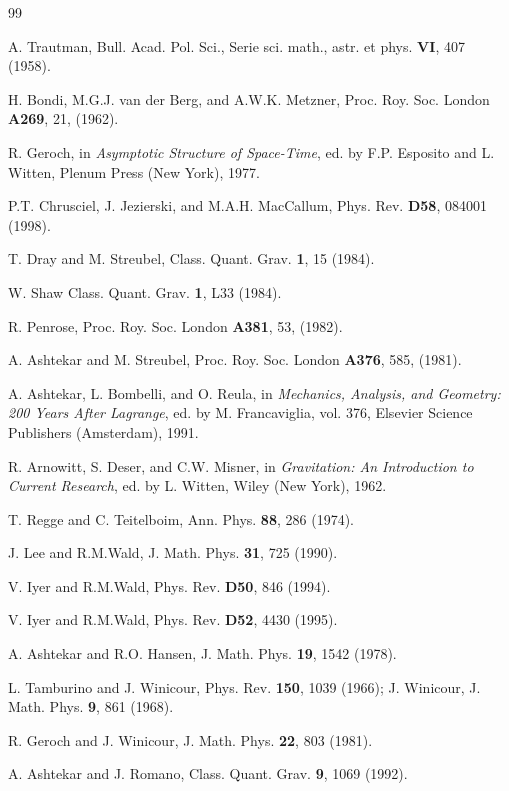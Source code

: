 \begin{thebibliography}{99}

 A. Trautman, Bull. Acad. Pol. Sci., Serie sci. math.,
astr. et phys. {\bf VI}, 407 (1958).

 H. Bondi, M.G.J. van der Berg, and A.W.K. Metzner,
Proc. Roy. Soc. London {\bf A269}, 21, (1962).

 R. Geroch, in {\it Asymptotic Structure of Space-Time},
ed. by F.P. Esposito and L. Witten, Plenum Press (New York), 1977.

 P.T. Chrusciel, J. Jezierski, and M.A.H. MacCallum,
Phys. Rev. {\bf D58}, 084001 (1998).

 T. Dray and M. Streubel, Class. Quant. Grav. {\bf 1}, 15
(1984).

 W. Shaw Class. Quant. Grav. {\bf 1}, L33 (1984).

 R. Penrose, Proc. Roy. Soc. London {\bf A381}, 53, (1982).

 A. Ashtekar and M. Streubel, Proc. Roy. Soc. London {\bf
A376}, 585, (1981).

 A. Ashtekar, L. Bombelli, and O. Reula, in {\it
Mechanics, Analysis, and Geometry: 200 Years After Lagrange}, ed. by
M. Francaviglia, vol. 376, Elsevier Science Publishers (Amsterdam),
1991.

 R. Arnowitt, S. Deser, and C.W. Misner, in {\it
Gravitation: An Introduction to Current Research}, ed. by L. Witten,
Wiley (New York), 1962.

 T. Regge and C. Teitelboim, Ann. Phys. {\bf 88}, 286
(1974).

 J. Lee and R.M.Wald, J. Math. Phys. {\bf 31}, 725 (1990).

 V. Iyer and R.M.Wald, Phys. Rev. {\bf D50}, 846 (1994).

 V. Iyer and R.M.Wald, Phys. Rev. {\bf D52}, 4430 (1995).

 A. Ashtekar and R.O. Hansen, J. Math. Phys. {\bf 19},
1542 (1978).

 L. Tamburino and J. Winicour, Phys. Rev. {\bf 150}, 1039
(1966); J. Winicour, J. Math. Phys. {\bf 9}, 861 (1968).

 R. Geroch and J. Winicour, J. Math. Phys. {\bf 22},
803 (1981).

 A. Ashtekar and J. Romano, Class. Quant. Grav. {\bf 9},
1069 (1992).


\end{thebibliography}
